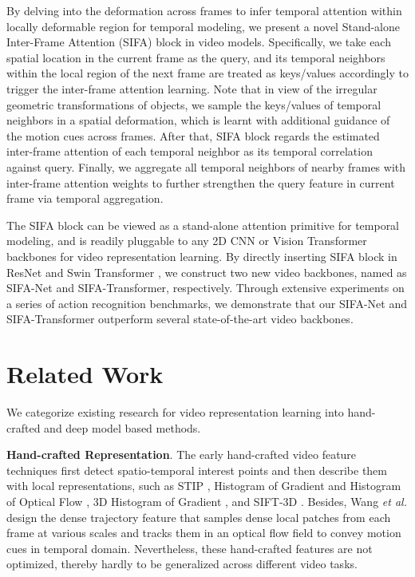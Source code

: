 \documentclass[10pt,twocolumn,letterpaper]{article}
\begin{document}
By delving into the deformation across frames to infer temporal attention within locally deformable region for temporal modeling, we present a novel Stand-alone Inter-Frame Attention (SIFA) block in video models. Specifically, we take each spatial location in the current frame as the query, and its temporal neighbors within the local region of the next frame are treated as keys/values accordingly to trigger the inter-frame attention learning. Note that in view of the irregular geometric transformations of objects, we sample the keys/values of temporal neighbors in a spatial deformation, which is learnt with additional guidance of the motion cues across frames. After that, SIFA block regards the estimated inter-frame attention of each temporal neighbor as its temporal correlation against query. Finally, we aggregate all temporal neighbors of nearby frames with inter-frame attention weights to further strengthen the query feature in current frame via temporal aggregation.

The SIFA block can be viewed as a stand-alone attention primitive for temporal modeling, and is readily pluggable to any 2D CNN or Vision Transformer backbones for video representation learning. By directly inserting SIFA block in ResNet \cite{Kaiming:CVPR16} and Swin Transformer \cite{Swin-ViT}, we construct two new video backbones, named as SIFA-Net and SIFA-Transformer, respectively. Through extensive experiments on a series of action recognition benchmarks, we demonstrate that our SIFA-Net and SIFA-Transformer outperform several state-of-the-art video backbones.

\section{Related Work}

We categorize existing research for video representation learning into hand-crafted and deep model based methods.

\textbf{Hand-crafted Representation}.
The early hand-crafted video feature techniques first detect spatio-temporal interest points and then describe them with local representations, such as STIP \cite{Laptev:IJCV05}, Histogram of Gradient and Histogram of Optical Flow \cite{Laptev:CVPR08}, 3D Histogram of Gradient \cite{Klaser:BMVC08}, and SIFT-3D \cite{Scovanner:MM07}.
Besides, Wang \emph{et al.} design the dense trajectory feature \cite{Wang:CVPR11} that samples dense local patches from each frame at various scales and tracks them in an optical flow field to convey motion cues in temporal domain. Nevertheless, these hand-crafted features are not optimized, thereby hardly to be generalized across different video tasks.
\end{document}

